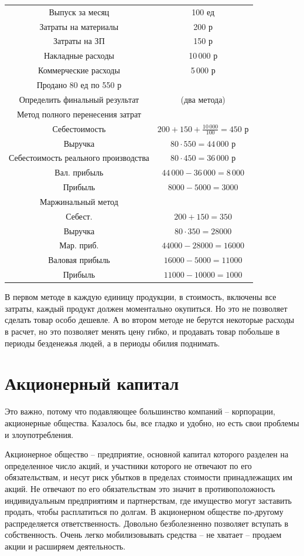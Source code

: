 \documentclass[a4paper, 12pt]{article}
\begin{document}
\begin{tabular}{|c c|}
\hline
Выпуск за месяц & 100 ед \\
Затраты на материалы & 200 р \\
Затраты на ЗП & 150 р \\
Накладные расходы & 10\,000 р \\
Коммерческие расходы & 5\,000 р \\
Продано 80 ед по 550 р & \\
\hline
Определить финальный результат & (два метода) \\
\hline
Метод полного перенесения затрат & \\
Себестоимость & $200 + 150 + \frac{10\,000}{100} = 450$ р \\
Выручка & $80\cdot 550 = 44\,000$ р \\
Себестоимость реального производства & $ 80\cdot 450 = 36\,000$ р \\
Вал. прибыль & $44\,000 - 36\,000 = 8\,000$ \\
Прибыль & $8000 - 5000 = 3000$ \\
\hline
Маржинальный метод & \\
Себест. & $200+150=350$  \\
Выручка & $80\cdot350 = 28000$ \\
Мар. приб. & $44000 - 28000 = 16000$ \\
Валовая прибыль & $16000 - 5000 = 11000$ \\
Прибыль & $11000 - 10000 = 1000$ \\
\hline
\end{tabular}

В первом методе в каждую единицу продукции, в стоимость, включены все затраты, каждый продукт должен моментально окупиться. Но это не позволяет сделать товар особо дешевле. А во втором методе не берутся некоторые расходы в расчет, но это позволяет менять цену гибко, и продавать товар побольше в периоды безденежья людей, а в периоды обилия поднимать. 

\section{Акционерный капитал}
Это важно, потому что подавляющее большинство компаний -- корпорации, акционерные общества. Казалось бы, все гладко и удобно, но есть свои проблемы и злоупотребления. 

Акционерное общество -- предприятие, основной капитал которого разделен на определенное число акций, и участники которого не отвечают по его обязательствам, и несут риск убытков в пределах стоимости принадлежащих им акций. Не отвечают по его обязательствам это значит в противоположность индивидуальным предприятиям и партнерствам, где имущество могут заставить продать, чтобы расплатиться по долгам. В акционерном обществе по-другому распределяется ответственность. Довольно безболезненно позволяет вступать в собственность. Очень легко мобилизовывать средства -- не хватает -- продаем акции и расширяем деятельность. 
\end{document}
